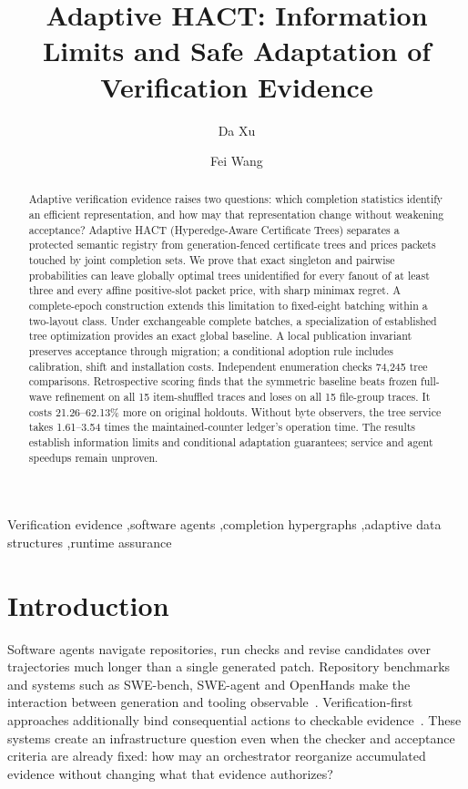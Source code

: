 \documentclass[preprint,12pt]{elsarticle}
\theoremstyle{definition}\newtheorem{definition}[theorem]{Definition}
\begin{document}
\begin{frontmatter}
\title{Adaptive HACT: Information Limits and Safe Adaptation of Verification Evidence}
\author[cmri]{Da Xu}
\author[cmri]{Fei Wang}
\address[cmri]{China Mobile Research Institute}
\begin{abstract}
Adaptive verification evidence raises two questions: which completion
statistics identify an efficient representation, and how may that
representation change without weakening acceptance? Adaptive HACT
(Hyperedge-Aware Certificate Trees) separates a protected semantic registry
from generation-fenced certificate trees and prices packets touched by joint
completion sets. We prove that exact singleton and pairwise probabilities
can leave globally optimal trees unidentified for every fanout of at least
three and every affine positive-slot packet price, with sharp minimax
regret. A complete-epoch construction extends this limitation to fixed-eight
batching within a two-layout class. Under exchangeable complete batches, a
specialization of established tree optimization provides an exact global
baseline. A local publication invariant preserves acceptance through
migration; a conditional adoption rule includes calibration, shift and
installation costs. Independent enumeration checks 74,245 tree comparisons.
Retrospective scoring finds that the symmetric baseline beats frozen
full-wave refinement on all 15 item-shuffled traces and loses on all 15
file-group traces. It costs 21.26--62.13\% more on original holdouts.
Without byte observers, the tree service takes 1.61--3.54 times the
maintained-counter ledger's operation time. The results establish
information limits and conditional adaptation guarantees; service and agent
speedups remain unproven.
\end{abstract}
\begin{keyword}
Verification evidence \sep software agents \sep completion hypergraphs \sep adaptive data structures \sep runtime assurance
\end{keyword}
\end{frontmatter}
\section{Introduction}
Software agents navigate repositories, run checks and revise candidates
over trajectories much longer than a single generated patch. Repository
benchmarks and systems such as SWE-bench, SWE-agent and OpenHands make
the interaction between generation and tooling observable~\cite{swebench,sweagent,openhands}.
Verification-first approaches additionally bind consequential actions to
checkable evidence~\cite{aiware,traceassurance}. These systems create an
infrastructure question even when the checker and acceptance criteria are
already fixed: how may an orchestrator reorganize accumulated evidence
without changing what that evidence authorizes?
\end{document}
